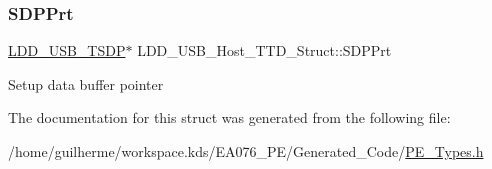 \subsubsection{\texorpdfstring{S\+D\+P\+Prt}{SDPPrt}}
{\footnotesize\ttfamily \hyperlink{group___p_e___types__module_ga093e1a023617fe020821061a0c557ad5}{L\+D\+D\+\_\+\+U\+S\+B\+\_\+\+T\+S\+DP}$\ast$ L\+D\+D\+\_\+\+U\+S\+B\+\_\+\+Host\+\_\+\+T\+T\+D\+\_\+\+Struct\+::\+S\+D\+P\+Prt}

Setup data buffer pointer 

The documentation for this struct was generated from the following file\+:\begin{DoxyCompactItemize}
\item 
/home/guilherme/workspace.\+kds/\+E\+A076\+\_\+\+P\+E/\+Generated\+\_\+\+Code/\hyperlink{_p_e___types_8h}{P\+E\+\_\+\+Types.\+h}\end{DoxyCompactItemize}
